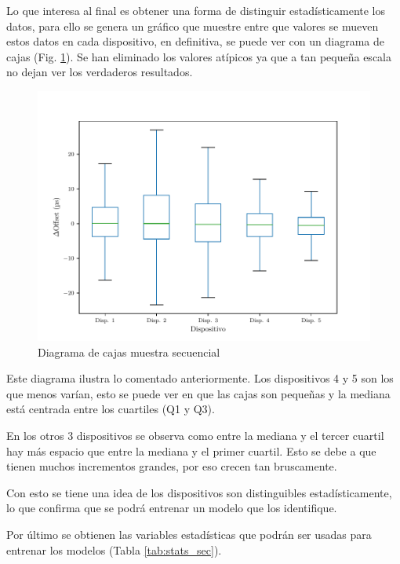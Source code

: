 Lo que interesa al final es obtener una forma de distinguir estadísticamente los datos, para ello se genera un gráfico que muestre entre que valores se mueven estos datos en cada dispositivo, en definitiva, se puede ver con un diagrama de cajas (Fig. \ref{fig:box_secuencial}). Se han eliminado los valores atípicos ya que a tan pequeña escala no dejan ver los verdaderos resultados.

\begin{figure}[htpb!]
    \centering
    \includegraphics{../Python/plots/individual/boxplot_no_out}
    \caption{Diagrama de cajas muestra secuencial}
    \label{fig:box_secuencial}
\end{figure}

Este diagrama ilustra lo comentado anteriormente. Los dispositivos 4 y 5 son los que menos varían, esto se puede ver en que las cajas son pequeñas y la mediana está centrada entre los cuartiles (Q1 y Q3). 

En los otros 3 dispositivos se observa como entre la mediana y el tercer cuartil hay más espacio que entre la mediana y el primer cuartil. Esto se debe a que tienen muchos incrementos grandes, por eso crecen tan bruscamente.

Con esto se tiene una idea de los dispositivos son distinguibles estadísticamente, lo que confirma que se podrá entrenar un modelo que los identifique.

\iffalse
Por último se obtienen las variables estadísticas que podrán ser usadas para entrenar los modelos (Tabla \ref{tab:stats_sec}). 

